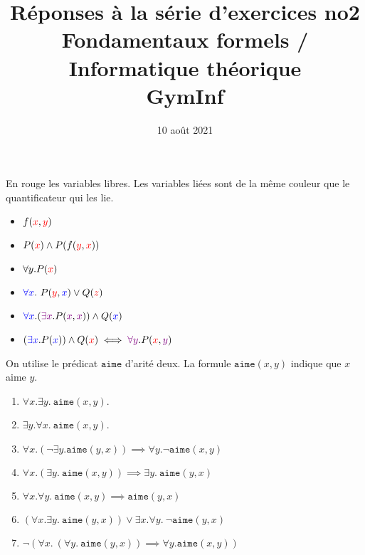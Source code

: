 \documentclass[12pt,french,a4paper]{article}
\begin{document}
\title{\vspace{-2cm}Réponses à la série d'exercices no2\\\large{Fondamentaux formels / Informatique théorique\\GymInf}}
\date{\vspace{-1cm}10 août 2021}

\maketitle

\begin{question}
En rouge les variables libres. Les variables liées sont de la même couleur que le quantificateur qui les lie.

\begin{itemize}
\item $f(\textcolor{red}{x}, \textcolor{red}{y})$
\item $P(\textcolor{red}{x}) \wedge P(f(\textcolor{red}{y}, \textcolor{red}{x}))$
\item $\forall y. P(\textcolor{red}{x})$
\item $\textcolor{blue}{\forall x}.\ P(\textcolor{red}{y}, \textcolor{blue}{x}) \vee Q(\textcolor{red}{z})$
\item $\textcolor{blue}{\forall x}. (\textcolor{violet}{\exists x}. P(\textcolor{violet}{x}, \textcolor{violet}{x})) \wedge Q(\textcolor{blue}{x})$
\item $(\textcolor{blue}{\exists x}. P(\textcolor{blue}{x})) \wedge Q(\textcolor{red}{x}) \iff \textcolor{violet}{\forall y}. P(\textcolor{red}{x}, \textcolor{violet}{y})$
\end{itemize}
\end{question}


\begin{question}
On utilise le prédicat $\texttt{aime}$ d'arité deux. La formule $\texttt{aime}(x, y)$ indique que $x$ aime $y$.
\begin{enumerate}
\item $\forall x. \exists y.\ \texttt{aime}(x, y)$.
\item $\exists y. \forall x.\ \texttt{aime}(x, y)$.
\item $\forall x. (\neg \exists y. \texttt{aime}(y, x)) \implies \forall y. \neg \texttt{aime}(x, y)$
\item $\forall x. (\exists y.\ \texttt{aime}(x, y)) \implies \exists y.\ \texttt{aime}(y, x)$
\item $\forall x. \forall y.\ \texttt{aime}(x, y) \implies \texttt{aime}(y, x)$
\item $(\forall x. \exists y.\ \texttt{aime}(y, x)) \vee \exists x. \forall y.\ \neg \texttt{aime}(y, x)$
\item $\neg (\forall x.\ (\forall y.\ \texttt{aime}(y, x)) \implies \forall y. \texttt{aime}(x, y))$
\end{enumerate}
\end{question}
\end{document}

